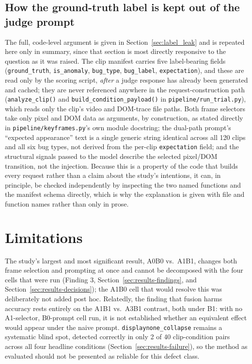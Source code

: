 \subsection{How the ground-truth label is kept out of the judge prompt}
The full, code-level argument is given in Section~\ref{sec:label_leak} and is repeated here only in summary, since that section is most directly responsive to the question as it was raised. The clip manifest carries five label-bearing fields (\texttt{ground\_truth}, \texttt{is\_anomaly}, \texttt{bug\_type}, \texttt{bug\_label}, \texttt{expectation}), and these are read only by the scoring script, \emph{after} a judge response has already been generated and cached; they are never referenced anywhere in the request-construction path (\texttt{analyze\_clip()} and \texttt{build\_condition\_payload()} in \texttt{pipeline/run\_trial.py}), which reads only the clip's video and DOM-trace file paths. Both frame selectors take only pixel and DOM data as arguments, by construction, as stated directly in \texttt{pipeline/keyframes.py}'s own module docstring; the dual-path prompt's ``expected appearance'' text is a single generic string identical across all 120 clips and all six bug types, not derived from the per-clip \texttt{expectation} field; and the structural signals passed to the model describe the selected pixel/DOM transition, not the injection. Because this is a property of the code that builds every request rather than a claim about the study's intentions, it can, in principle, be checked independently by inspecting the two named functions and the manifest schema directly, which is why the explanation is given with file and function names rather than only in prose.

\section{Limitations}
\label{sec:results-limitations}
The study's largest and most significant result, A0B0 vs.\ A1B1, changes both frame selection and prompting at once and cannot be decomposed with the four cells that were run (Finding 3, Section~\ref{sec:results-findings}, and Section~\ref{sec:results-decisions}); the A1B0 cell that would resolve this was deliberately not added post hoc. Relatedly, the finding that fusion harms accuracy rests entirely on the A1B1 vs.\ A3B1 contrast, both under B1: with no A1-selector, B0-prompt cell run, it is not established whether an equivalent effect would appear under the naive prompt. \texttt{displaynone\_collapse} remains a systematic blind spot, detected correctly in only 2 of 40 clip-condition pairs across all four headline conditions (Section~\ref{sec:results-failure}), so the method as evaluated should not be presented as reliable for this defect class.

